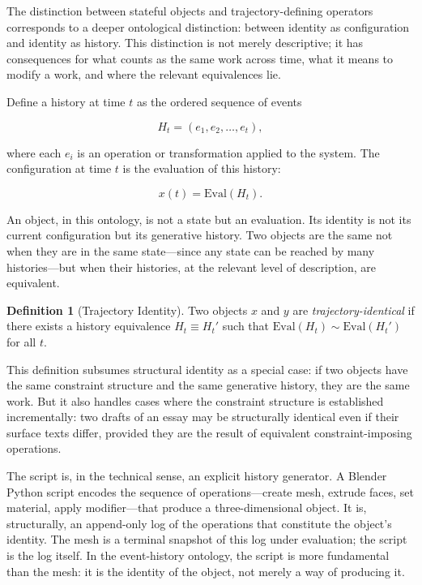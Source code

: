 \documentclass[11pt, twoside]{article}
\theoremstyle{plain}
\theoremstyle{definition}
\newtheorem{definition}[theorem]{Definition}
\theoremstyle{remark}
\begin{document}
The distinction between stateful objects and trajectory-defining operators corresponds to a deeper ontological distinction: between identity as configuration and identity as history. This distinction is not merely descriptive; it has consequences for what counts as the same work across time, what it means to modify a work, and where the relevant equivalences lie.

Define a history at time $t$ as the ordered sequence of events

\[
H_t = (e_1, e_2, \dots, e_t),
\]

where each $e_i$ is an operation or transformation applied to the system. The configuration at time $t$ is the evaluation of this history:

\[
x(t) = \text{Eval}(H_t).
\]

An object, in this ontology, is not a state but an evaluation. Its identity is not its current configuration but its generative history. Two objects are the same not when they are in the same state---since any state can be reached by many histories---but when their histories, at the relevant level of description, are equivalent.

\begin{definition}[Trajectory Identity]
Two objects $x$ and $y$ are \emph{trajectory-identical} if there exists a history equivalence $H_t \equiv H_t'$ such that $\text{Eval}(H_t) \sim \text{Eval}(H_t')$ for all $t$.
\end{definition}

This definition subsumes structural identity as a special case: if two objects have the same constraint structure and the same generative history, they are the same work. But it also handles cases where the constraint structure is established incrementally: two drafts of an essay may be structurally identical even if their surface texts differ, provided they are the result of equivalent constraint-imposing operations.

The script is, in the technical sense, an explicit history generator. A Blender Python script encodes the sequence of operations---create mesh, extrude faces, set material, apply modifier---that produce a three-dimensional object. It is, structurally, an append-only log of the operations that constitute the object's identity. The mesh is a terminal snapshot of this log under evaluation; the script is the log itself. In the event-history ontology, the script is more fundamental than the mesh: it is the identity of the object, not merely a way of producing it.
\end{document}
